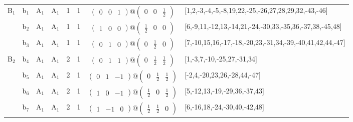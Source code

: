 \documentclass[fleqn,10pt,landscape]{article}
\begin{document}
\begin{itemize}
\begin{center}
\begin{longtable}{cc|cc|c|c|c|l}
B$_{1}$ & b$_{1}$ & A$_{1}$ & A$_{1}$ & 1 & 1 & $\begin{pmatrix} 0 & 0 & 1 \end{pmatrix}@\begin{pmatrix} 0 & 0 & \frac{1}{2} \end{pmatrix}$ & [1,2,-3,-4,-5,-8,19,22,-25,-26,27,28,29,32,-43,-46] \\
& b$_{2}$ & A$_{1}$ & A$_{1}$ & 1 & 1 & $\begin{pmatrix} 1 & 0 & 0 \end{pmatrix}@\begin{pmatrix} \frac{1}{2} & 0 & 0 \end{pmatrix}$ & [6,-9,11,-12,13,-14,21,-24,-30,33,-35,36,-37,38,-45,48] \\
& b$_{3}$ & A$_{1}$ & A$_{1}$ & 1 & 1 & $\begin{pmatrix} 0 & 1 & 0 \end{pmatrix}@\begin{pmatrix} 0 & \frac{1}{2} & 0 \end{pmatrix}$ & [7,-10,15,16,-17,-18,-20,23,-31,34,-39,-40,41,42,44,-47] \\ \hline
B$_{2}$ & b$_{4}$ & A$_{1}$ & A$_{1}$ & 2 & 1 & $\begin{pmatrix} 0 & 1 & 1 \end{pmatrix}@\begin{pmatrix} 0 & \frac{1}{2} & \frac{1}{2} \end{pmatrix}$ & [1,-3,7,-10,-25,27,-31,34] \\
& b$_{5}$ & A$_{1}$ & A$_{1}$ & 2 & 1 & $\begin{pmatrix} 0 & 1 & -1 \end{pmatrix}@\begin{pmatrix} 0 & \frac{1}{2} & \frac{1}{2} \end{pmatrix}$ & [-2,4,-20,23,26,-28,44,-47] \\
& b$_{6}$ & A$_{1}$ & A$_{1}$ & 2 & 1 & $\begin{pmatrix} 1 & 0 & -1 \end{pmatrix}@\begin{pmatrix} \frac{1}{2} & 0 & \frac{1}{2} \end{pmatrix}$ & [5,-12,13,-19,-29,36,-37,43] \\
& b$_{7}$ & A$_{1}$ & A$_{1}$ & 2 & 1 & $\begin{pmatrix} 1 & -1 & 0 \end{pmatrix}@\begin{pmatrix} \frac{1}{2} & \frac{1}{2} & 0 \end{pmatrix}$ & [6,-16,18,-24,-30,40,-42,48] \\

\end{longtable}
\end{center}
\end{itemize}
\end{document}
